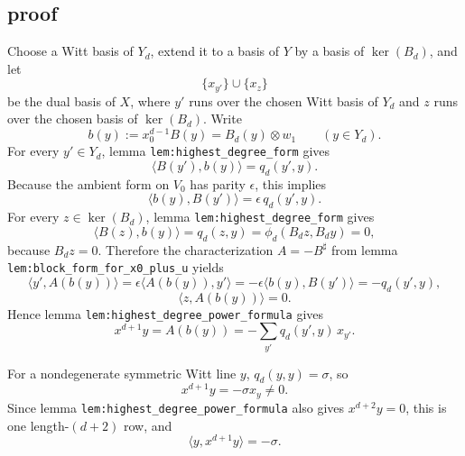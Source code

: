 \documentclass[
]{article}
\begin{document}
\subsection{proof}\label{proof-14}

Choose a Witt basis of \(Y_d\), extend it to a basis of \(Y\) by a basis
of \(\ker(B_d)\), and let \[
\{x_{y'}\}\cup \{x_z\}
\] be the dual basis of \(X\), where \(y'\) runs over the chosen Witt
basis of \(Y_d\) and \(z\) runs over the chosen basis of \(\ker(B_d)\).
Write \[
b(y):=x_0^{d-1}B(y)=B_d(y)\otimes w_1\qquad (y\in Y_d).
\] For every \(y'\in Y_d\), lemma \texttt{lem:highest\_degree\_form}
gives \[
\langle B(y'),b(y)\rangle=q_d(y',y).
\] Because the ambient form on \(V_0\) has parity \(\epsilon\), this
implies \[
\langle b(y),B(y')\rangle=\epsilon\,q_d(y',y).
\] For every \(z\in \ker(B_d)\), lemma
\texttt{lem:highest\_degree\_form} gives \[
\langle B(z),b(y)\rangle=q_d(z,y)=\phi_d(B_dz,B_dy)=0,
\] because \(B_dz=0\). Therefore the characterization \(A=-B^\sharp\)
from lemma \texttt{lem:block\_form\_for\_x0\_plus\_u} yields \[
\langle y',A(b(y))\rangle
=
\epsilon\langle A(b(y)),y'\rangle
=
-\epsilon\langle b(y),B(y')\rangle
=
-q_d(y',y),
\] \[
\langle z,A(b(y))\rangle=0.
\] Hence lemma \texttt{lem:highest\_degree\_power\_formula} gives \[
x^{d+1}y=A(b(y))=-\sum_{y'} q_d(y',y)\,x_{y'}.
\]

For a nondegenerate symmetric Witt line \(y\), \(q_d(y,y)=\sigma\), so
\[
x^{d+1}y=-\sigma x_y\neq 0.
\] Since lemma \texttt{lem:highest\_degree\_power\_formula} also gives
\(x^{d+2}y=0\), this is one length-\((d+2)\) row, and \[
\langle y,x^{d+1}y\rangle=-\sigma.
\]
\end{document}
